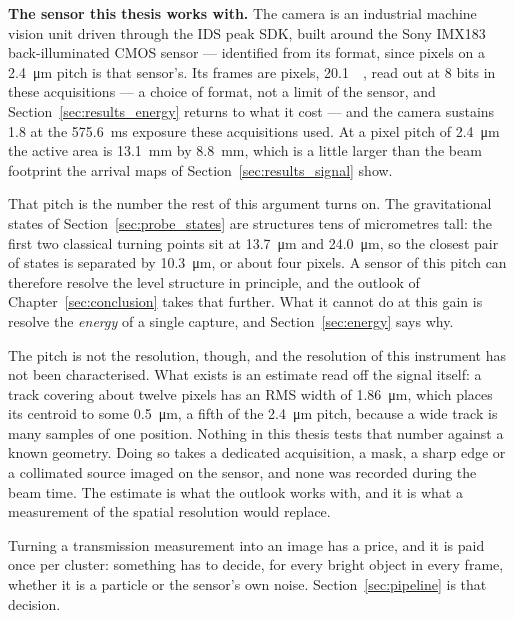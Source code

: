 \documentclass[a4paper,headsepline,oneside,11pt]{scrartcl}
\begin{document}
\textbf{The sensor this thesis works with.} The camera is an industrial machine
vision unit driven through the IDS peak SDK, built around the Sony IMX183
back-illuminated CMOS sensor --- identified from its format, since
 pixels on a \SI{2.4}{\micro\metre} pitch is that
sensor's. Its frames are  pixels, \SI{20.1}{\mega\pixel},
read out at 8 bits in these acquisitions --- a choice of format, not a limit of
the sensor, and Section~\ref{sec:results_energy} returns to what it cost --- and
the camera sustains \SI{1.8}{\fps} at the
\SI{575.6}{\milli\second} exposure these acquisitions used. At a pixel pitch of
\SI{2.4}{\micro\metre} the active area is \SI{13.1}{\milli\metre} by
\SI{8.8}{\milli\metre}, which is a little larger than the beam footprint the
arrival maps of Section~\ref{sec:results_signal} show.

That pitch is the number the rest of this argument turns on. The gravitational
states of Section~\ref{sec:probe_states} are structures tens of micrometres
tall: the first two classical turning points sit at \SI{13.7}{\micro\metre} and
\SI{24.0}{\micro\metre}, so the closest pair of states is separated by
\SI{10.3}{\micro\metre}, or about four pixels. A sensor of this pitch can
therefore resolve the level structure in principle, and the outlook of
Chapter~\ref{sec:conclusion} takes that further. What it cannot do at this gain is resolve the
\emph{energy} of a single capture, and Section~\ref{sec:energy} says why.

The pitch is not the resolution, though, and the resolution of this instrument
has not been characterised. What exists is an estimate read off the signal
itself: a track covering about twelve pixels has an RMS width of
\SI{1.86}{\micro\metre}, which places its centroid to some
\SI{0.5}{\micro\metre}, a fifth of the \SI{2.4}{\micro\metre} pitch, because a
wide track is many samples of one position. Nothing in this thesis tests that
number against a known geometry. Doing so takes a dedicated acquisition, a mask,
a sharp edge or a collimated source imaged on the sensor, and none was recorded
during the beam time. The estimate is what the outlook works with, and it is what a measurement of the spatial resolution would replace.

Turning a transmission measurement into an image has a price, and it is paid
once per cluster: something has to decide, for every bright object in every
frame, whether it is a particle or the sensor's own noise.
Section~\ref{sec:pipeline} is that decision.
\end{document}
